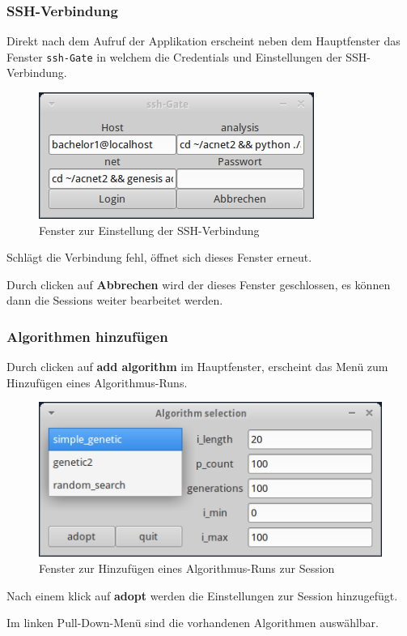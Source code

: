 \documentclass[
  a4paper,               %
  twoside,               %
  DIV=12,                %
  BCOR=8mm,              %
  headinclude=true,      %
  footinclude=false,     %
  numbers=noenddot,      %
  headheight=40pt,       %
  11pt]{scrartcl}        %
\begin{document}
\subsubsection{SSH-Verbindung}
Direkt nach dem Aufruf der Applikation erscheint neben dem Hauptfenster das Fenster \texttt{ssh-Gate} in welchem die Credentials und Einstellungen der SSH-Verbindung.
\begin{figure}[h]
\includegraphics[scale=1]{ssh-frame.png}
\caption{Fenster zur Einstellung der SSH-Verbindung}
\end{figure}

Schlägt die Verbindung fehl, öffnet sich dieses Fenster erneut.

Durch clicken auf \textbf{Abbrechen} wird der dieses Fenster geschlossen, es können dann die Sessions weiter bearbeitet werden.

\subsubsection{Algorithmen hinzufügen}
Durch clicken auf \textbf{add algorithm} im Hauptfenster, erscheint das Menü zum Hinzufügen eines Algorithmus-Runs.
\begin{figure}[h]
\includegraphics[scale=1]{addalg.png}
\caption{Fenster zur Hinzufügen eines Algorithmus-Runs zur Session}
\end{figure}

Nach einem klick auf \textbf{adopt} werden die Einstellungen zur Session hinzugefügt.

Im linken Pull-Down-Menü sind die vorhandenen Algorithmen auswählbar.
\end{document}

